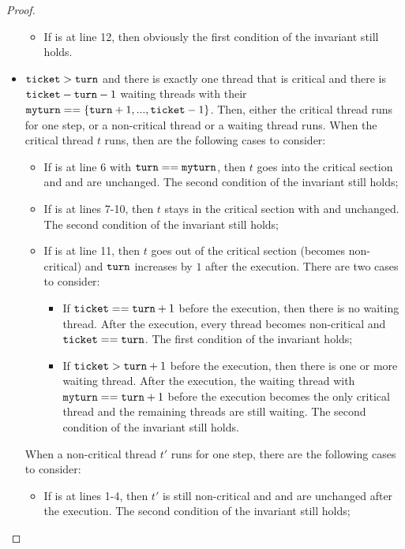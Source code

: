 \documentclass{article}[10pt]
\begin{document}
\begin{proof}
\begin{itemize}
\begin{itemize}
      \item If  is at line 12, then obviously the first
        condition of the invariant still holds.

    \end{itemize}

  \item 
    $\text{\ttfamily ticket} > \text{\ttfamily turn}$ and there is exactly one thread that is
    critical and there is $\text{\ttfamily ticket} - \text{\ttfamily turn} - 1$ waiting threads with
    their $\text{\ttfamily myturn} == \{\text{\ttfamily turn}+1,...,\text{\ttfamily ticket} - 1\}$. Then, either
    the critical thread runs for one step, or a non-critical thread or
    a waiting thread runs.
    When the critical thread $t$ runs, then are the following cases
    to consider:
    \begin{itemize}
    \item If  is at line 6 with $\text{\ttfamily turn} == \text{\ttfamily myturn}$, then $t$
      goes into the critical section and \kturn and \kticket are
      unchanged. The second condition of the invariant still holds;

    \item If  is at lines 7-10, then $t$ stays in the critical
      section with \kturn and \kticket unchanged. The second condition
      of the invariant still holds;

    \item If  is at line 11, then $t$ goes out of the critical
      section (becomes non-critical) and $\text{\ttfamily turn}$ increases by $1$
      after the execution. There are two cases to consider:
      \begin{itemize}
      \item If $\text{\ttfamily ticket} == \text{\ttfamily turn} +1$ before the execution, then
        there is no waiting thread. After the execution, every thread
        becomes non-critical and $\text{\ttfamily ticket} == \text{\ttfamily turn}$. The first
        condition of the invariant holds;

      \item If $\text{\ttfamily ticket} > \text{\ttfamily turn} +1$ before the execution, then there
        is one or more waiting thread. After the execution, the
        waiting thread with $\text{\ttfamily myturn} == \text{\ttfamily turn} +1$ before the
        execution becomes the only critical thread and the remaining
        threads are still waiting. The second condition of the
        invariant still holds.

      \end{itemize}

    \end{itemize}
    When a non-critical thread $t'$ runs for one step, there are the
    following cases to consider:
    \begin{itemize}
    \item If  is at lines 1-4, then $t'$ is still non-critical
      and \kticket and \kturn are unchanged after the execution. The
      second condition of the invariant still holds;


\end{itemize}
\end{itemize}
\end{proof}
\end{document}
